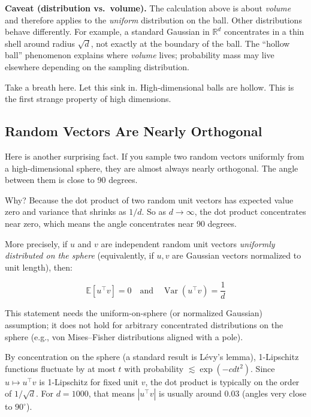 \vspace{0.5em}

\textbf{Caveat (distribution vs.\ volume).} The calculation above is about \emph{volume} and therefore applies to the \emph{uniform} distribution on the ball. Other distributions behave differently. For example, a standard Gaussian in $\mathbb{R}^d$ concentrates in a thin shell around radius $\sqrt{d}$, not exactly at the boundary of the ball. The ``hollow ball'' phenomenon explains where \emph{volume} lives; probability mass may live elsewhere depending on the sampling distribution.

Take a breath here. Let this sink in. High-dimensional balls are hollow. This is the first strange property of high dimensions.

\vspace{1.5em}

\subsection{Random Vectors Are Nearly Orthogonal}

Here is another surprising fact. If you sample two random vectors uniformly from a high-dimensional sphere, they are almost always nearly orthogonal. The angle between them is close to 90 degrees.

Why? Because the dot product of two random unit vectors has expected value zero and variance that shrinks as $1/d$. So as $d \to \infty$, the dot product concentrates near zero, which means the angle concentrates near 90 degrees.

\vspace{1em}

More precisely, if $u$ and $v$ are independent random unit vectors \emph{uniformly distributed on the sphere} (equivalently, if $u,v$ are Gaussian vectors normalized to unit length), then:

\begin{equation}
\mathbb{E}[u^\top v] = 0 \quad \text{and} \quad \operatorname{Var}(u^\top v) = \frac{1}{d}
\end{equation}

This statement needs the uniform-on-sphere (or normalized Gaussian) assumption; it does not hold for arbitrary concentrated distributions on the sphere (e.g., von Mises--Fisher distributions aligned with a pole).

By concentration on the sphere (a standard result is Lévy's lemma), 1-Lipschitz functions fluctuate by at most $t$ with probability $\lesssim \exp(-c d t^2)$. Since $u \mapsto u^\top v$ is 1-Lipschitz for fixed unit $v$, the dot product is typically on the order of $1/\sqrt{d}$. For $d = 1000$, that means $|u^\top v|$ is usually around $0.03$ (angles very close to $90^\circ$).


